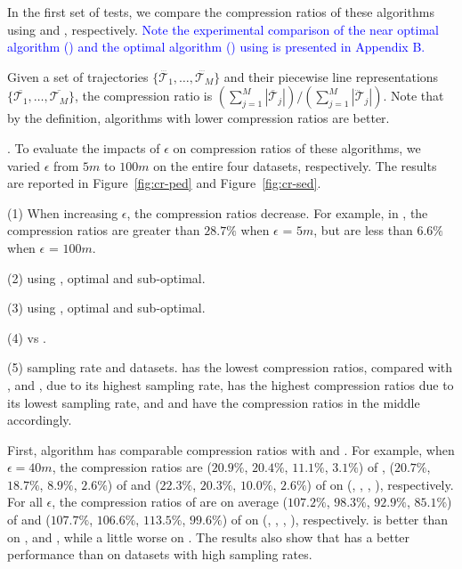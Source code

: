In the first set of tests, we compare the compression ratios of these algorithms using \ped and \sed, respectively.
\textcolor{blue}{Note the experimental comparison of the near optimal algorithm (\nopts) and the optimal algorithm (\opt) using \sed is presented in Appendix B.}

Given a set of trajectories $\{\dddot{\mathcal{T}_1}, \ldots, \dddot{\mathcal{T}_M}\}$ and their piecewise line representations
$\{\overline{\mathcal{T}_1}, \ldots, \overline{\mathcal{T}_M}\}$,
 the compression ratio is $(\sum_{j=1}^{M} |\overline{\mathcal{T}}_j |)/(\sum_{j=1}^{M} |\dddot{\mathcal{T}}_j |)$.
 Note that by the definition, algorithms with lower compression ratios are better.



.
To evaluate the impacts of $\epsilon$ on compression ratios of these algorithms, we varied $\epsilon$ from $5m$ to $100m$ on
 the entire four datasets, respectively.
The results are reported in Figure~\ref{fig:cr-ped} and Figure~\ref{fig:cr-sed}.

\sstab (1) When increasing $\epsilon$, the compression ratios decrease. For example, in \ucar,
the compression ratios are greater than $28.7\%$ when $\epsilon$ = $5m$, but are less than $6.6\%$ when $\epsilon$ = $100m$.

\sstab (2) using \ped, optimal and sub-optimal.

\sstab (3) using \sed, optimal and sub-optimal.

\sstab (4) \ped vs \sed.
	
\sstab (5) sampling rate and datasets.
\geolife has the lowest compression ratios, compared with \taxi, \truck and \ucar, due to its highest sampling rate, \taxi has the highest compression ratios due to its lowest sampling rate, and \truck and \ucar have the compression ratios in the middle accordingly.

	
{First, algorithm \operb has comparable compression ratios with \fbqsa and \dpa.
For example, when $\epsilon = 40m$, the compression ratios are ($20.9\%$, $20.4\%$, $11.1\%$, $3.1\%$) of \fbqsa, ($20.7\%$, $18.7\%$, $8.9\%$, $2.6\%$) of \dpa and ($22.3\%$, $20.3\%$, $10.0\%$, $2.6\%$) of \operb on (\taxi, \truck, \ucar, \geolife), respectively.
For all $\epsilon$, the compression ratios of \operb are on average ($107.2\%$, $98.3\%$, $92.9\%$, {$85.1\%$}) of \fbqsa and ($107.7\%$, $106.6\%$, $113.5\%$, $99.6\%$) of \dpa on (\taxi, \truck, \ucar, \geolife), respectively.
\operb is better than  \fbqsa on \truck, \ucar and \geolife, while a little worse on \taxi. The results also show that \operb has a better performance than \fbqsa on datasets with high sampling rates.}

